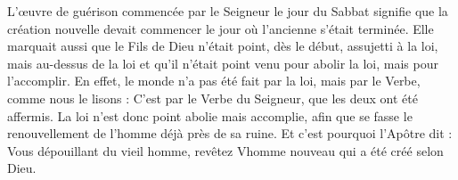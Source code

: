 L’œuvre de guérison commencée par le Seigneur le jour du Sabbat signifie que la création nouvelle devait commencer le jour où l'ancienne s’était terminée. Elle marquait aussi que le Fils de Dieu n’était point, dès le début, assujetti à la loi, mais au-dessus de la loi et qu’il n’était point venu pour abolir la loi, mais pour l’accomplir. En effet, le monde n’a pas été fait par la loi, mais par le Verbe, comme nous le lisons : C’est par le Verbe du Seigneur, que les deux ont été affermis. La loi n’est donc point abolie mais accomplie, afin que se fasse le renouvellement de l’homme déjà près de sa ruine. Et c’est pourquoi l’Apôtre dit : Vous dépouillant du vieil homme, revêtez Vhomme nouveau qui a été créé selon Dieu.
